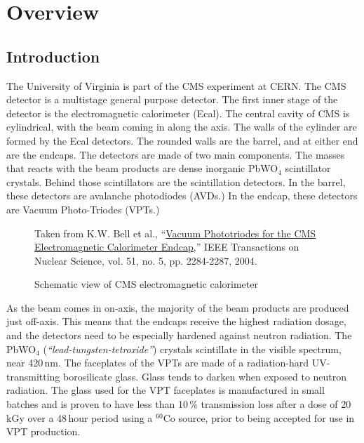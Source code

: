 
\chapter{Overview}
\label{sec:eq_intro}

\section{Introduction}
\label{sec:eq_intro:intro}

The University of Virginia is part of the CMS experiment at CERN.  The CMS detector is a multistage general purpose detector.  The first inner stage of the detector is the electromagnetic calorimeter (Ecal).  The central cavity of CMS is cylindrical, with the beam coming in along the axis.  The walls of the cylinder are formed by the Ecal detectors.  The rounded walls are the barrel, and at either end are the endcaps.  The detectors are made of two main components.  The masses that reacts with the beam products are dense inorganic PbWO$_4$ scintillator crystals.  Behind those scintillators are the scintillation detectors.  In the barrel, these detectors are avalanche photodiodes (AVDs.)  In the endcap, these detectors are Vacuum Photo-Triodes (VPTs.)

\begin{figure}[htbp]
  \centering
  \parbox{0.75\textwidth}{\tiny
    Taken from K.W. Bell et al., ``\href{papers/1344324}{Vacuum Phototriodes for the CMS Electromagnetic Calorimeter Endcap},'' IEEE Transactions on Nuclear Science, vol. 51, no. 5, pp. 2284-2287, 2004.}
  \caption{Schematic view of CMS electromagnetic calorimeter}
  \label{fig:eq_intro:ecal}
\end{figure}

As the beam comes in on-axis, the majority of the beam products are produced just off-axis.  This means that the endcaps receive the highest radiation dosage, and the detectors need to be especially hardened against neutron radiation.  The PbWO$_4$ (\textit{``lead-tungsten-tetroxide''}) crystals scintillate in the visible spectrum, near 420\,nm.   The faceplates of the VPTs are made of a radiation-hard UV-transmitting borosilicate glass.  Glass tends to darken when exposed to neutron radiation.  The glass used for the VPT faceplates is manufactured in small batches and is proven to have less than 10\,\% transmission loss after a dose of 20\,kGy over a 48\,hour period using a $^{60}$Co source, prior to being accepted for use in VPT production.

